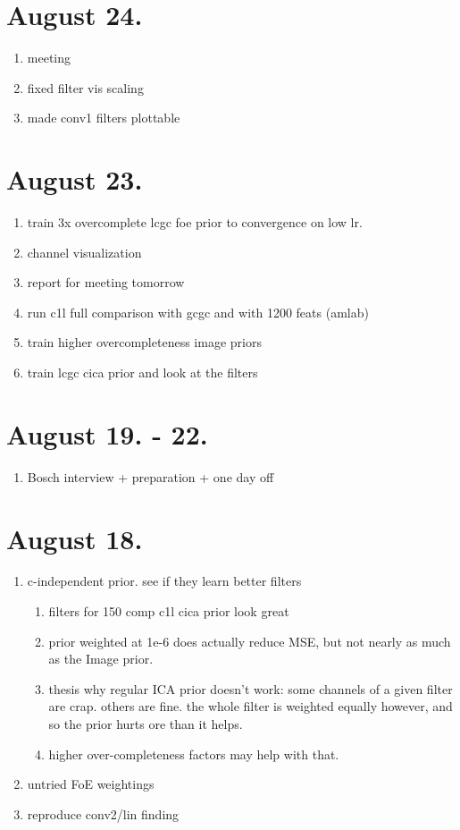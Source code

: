 \documentclass{article}
\begin{document}
\section{August 24.}

\begin{enumerate}
	\item meeting
	\item fixed filter vis scaling
	\item made conv1 filters plottable
\end{enumerate}


\section{August 23.}

\begin{enumerate}
	\item train 3x overcomplete lcgc foe prior to convergence on low lr.
	\item channel visualization
	\item report for meeting tomorrow
	\item run c1l full comparison with gcgc and with 1200 feats (amlab)
	\item train higher overcompleteness image priors
	\item train lcgc cica prior and look at the filters
\end{enumerate}

\section{August 19. - 22.}

\begin{enumerate}
	\item Bosch interview + preparation + one day off
\end{enumerate}


\section{August 18.}

\begin{enumerate}
	\item c-independent prior. see if they learn better filters
	\begin{enumerate}
		\item filters for 150 comp c1l cica prior look great
		\item prior weighted at 1e-6 does actually reduce MSE, but not nearly as much as the Image prior.
		\item thesis why regular ICA prior doesn't work: some channels of a given filter are crap. others are fine. the whole filter is weighted equally however, and so the prior hurts ore than it helps.
		\item higher over-completeness factors may help with that.
	\end{enumerate}
	\item untried FoE weightings
	\item reproduce conv2/lin finding
\end{enumerate}
\end{document}
